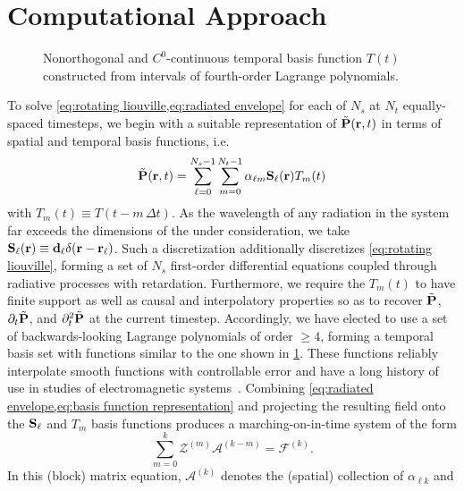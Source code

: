 \section{Computational Approach}

\begin{figure}
  
  \caption{\label{fig:interpolation basis} Nonorthogonal and $C^0$-continuous temporal basis function $T(t)$ constructed from intervals of fourth-order Lagrange polynomials.}
\end{figure}
To solve \cref{eq:rotating liouville,eq:radiated envelope} for each of $N_s$ \qds{} at $N_t$ equally-spaced timesteps, we begin with a suitable representation of $\tilde{\vb{P}}(\vb{r}, t)$ in terms of spatial and temporal basis functions, i.e.~
\begin{equation}
  \tilde{\vb{P}}(\vb{r}, t) = \sum_{\ell=0}^{N_s - 1} \sum_{m = 0}^{N_t - 1} \alpha_{\ell m} \vb{S}_\ell(\vb{r}) T_m(t)
  \label{eq:basis function representation}
\end{equation}
with $T_m(t) \equiv T(t - m \, \Delta t)$.
As the wavelength of any radiation in the system far exceeds the dimensions of the \qds{} under consideration, we take $\vb{S}_\ell(\vb{r}) \equiv \vb{d}_\ell \delta(\vb{r} - \vb{r}_\ell)$.
Such a discretization additionally discretizes \cref{eq:rotating liouville}, forming a set of $N_s$ first-order differential equations coupled through radiative processes with retardation.
Furthermore, we require the $T_m(t)$ to have finite support as well as causal and interpolatory properties so as to recover $\tilde{\vb{P}}$, $\partial_t \tilde{\vb{P}}$, and $\partial^2_t \tilde{\vb{P}}$ at the current timestep.
Accordingly, we have elected to use a set of backwards-looking Lagrange polynomials of order $\ge 4$, forming a temporal basis set with functions similar to the one shown in \cref{fig:interpolation basis}.
These functions  reliably interpolate smooth functions with controllable error and have a long history of use in studies of electromagnetic systems~\cite{SHANKER,SHANKER,SHANKER}.
Combining \cref{eq:radiated envelope,eq:basis function representation} and projecting the resulting field onto the $\vb{S}_\ell$ and $T_m$ basis functions produces a marching-on-in-time system of the form
\begin{equation}
  \sum_{m = 0}^{k} \mathcal{Z}^{(m)} \mathcal{A}^{(k - m)} = \mathcal{F}^{(k)}.
  \label{eq:zmatrix}
\end{equation}
In this (block) matrix equation, $\mathcal{A}^{(k)}$ denotes the (spatial) collection of $\alpha_{\ell k}$ and
